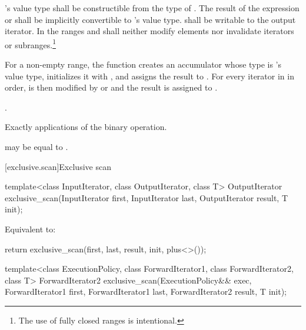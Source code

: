 \begin{itemdescr}
\pnum
\requires
{}'s value type shall be constructible from the type of .
The result of the expression  or  shall be
implicitly convertible to 's value type. 
shall be writable to the  output iterator.
In the ranges
and
shall neither modify elements nor invalidate iterators or subranges.\footnote{The use of fully closed ranges is intentional.
}

\pnum
\effects For a non-empty range,
the function creates an accumulator  whose type is 's
value type, initializes it with ,
and assigns the result to . For every iterator  in 
in order,  is then modified by  or 
and the result is assigned to .

\pnum
\returns
{}.

\pnum
\complexity
Exactly
applications of
the binary operation.

\pnum
\remarks
{}
may be equal to
.
\end{itemdescr}

[exclusive.scan]{Exclusive scan}

%
\begin{itemdecl}
template<class InputIterator, class OutputIterator, class T>
  OutputIterator exclusive_scan(InputIterator first, InputIterator last,
                                OutputIterator result, T init);
\end{itemdecl}

\begin{itemdescr}
\pnum
\effects Equivalent to:
\begin{codeblock}
return exclusive_scan(first, last, result, init, plus<>());
\end{codeblock}
\end{itemdescr}

%
\begin{itemdecl}
template<class ExecutionPolicy, class ForwardIterator1, class ForwardIterator2, class T>
  ForwardIterator2 exclusive_scan(ExecutionPolicy&& exec,
                                  ForwardIterator1 first, ForwardIterator1 last,
                                  ForwardIterator2 result, T init);
\end{itemdecl}


